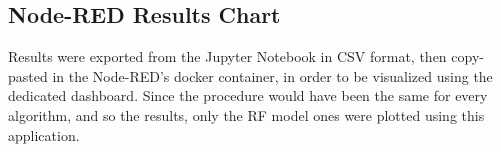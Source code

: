 \documentclass{article}
\begin{document}
\subsection[]{Node-RED Results Chart}

Results were exported from the Jupyter Notebook in CSV format, then copy-pasted in the Node-RED's docker container, in order to be visualized using the dedicated dashboard. Since the procedure would have been the same for every algorithm, and so the results, only the RF model ones were plotted using this application.
 
\end{document}
